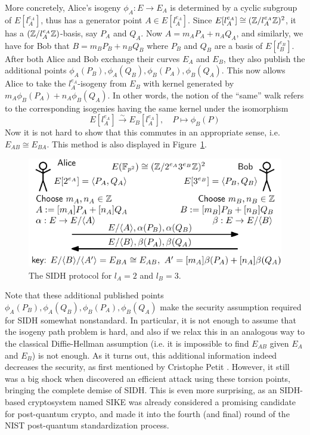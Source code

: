 More concretely, Alice's isogeny $\phi_A: E \to E_A$ is determined by a cyclic subgroup of $E[l_A^{e_A}]$, thus has a generator point $A \in E[l_A^{e_A}]$.
Since $E[l_A^{e_A}] \cong (\mathbb{Z}/l_A^{e_A}\mathbb{Z})^2$, it has a $(\mathbb{Z}/l_A^{e_A}\mathbb{Z})$-basis, say $P_A$ and $Q_A$.
Now $A = m_A P_A + n_A Q_A$, and similarly, we have for Bob that $B = m_B P_B + n_B Q_B$ where $P_B$ and $Q_B$ are a basis of $E[l_B^{e_B}]$.
After both Alice and Bob exchange their curves $E_A$ and $E_B$, they also publish the additional points $\phi_A(P_B), \phi_A(Q_B), \phi_B(P_A), \phi_B(Q_A)$.
This now allows Alice to take the $l_A^{e_A}$-isogeny from $E_B$ with kernel generated by $m_A \phi_B(P_A) + n_A \phi_B(Q_A)$.
In other words, the notion of the ``same'' walk refers to the corresponding isogenies having the same kernel under the isomorphism
\begin{equation*}
    E[l_A^{e_A}] \overset{\sim}{\longrightarrow} E_B[l_A^{e_A}], \quad P \mapsto \phi_B(P)
\end{equation*}
Now it is not hard to show that this commutes in an appropriate sense, i.e. $E_{AB} \cong E_{BA}$.
This method is also displayed in Figure~\ref{fig:sidh}.
\begin{figure}
    \includegraphics[width = \textwidth]{./sidh.pdf}
    \caption{\label{fig:sidh} The SIDH protocol for $l_A = 2$ and $l_B = 3$.}
\end{figure}

Note that these additional published points $\phi_A(P_B), \phi_A(Q_B), \phi_B(P_A), \phi_B(Q_A)$ make the security assumption required for SIDH somewhat nonstandard.
In particular, it is not enough to assume that the isogeny path problem is hard, and also if we relax this in an analogous way to the classical Diffie-Hellman assumption (i.e. it is impossible to find $E_{AB}$ given $E_A$ and $E_B$) is not enough.
As it turns out, this additional information indeed decreases the security, as first mentioned by Cristophe Petit \cite{torsion_point_attack}.
However, it still was a big shock when \cite{sidh_broken} discovered an efficient attack using these torsion points, bringing the complete demise of SIDH.
This is even more surprising, as an SIDH-based cryptosystem named SIKE \cite{sike} was already considered a promising candidate for post-quantum crypto, and made it into the fourth (and final) round of the NIST post-quantum standardization process.

